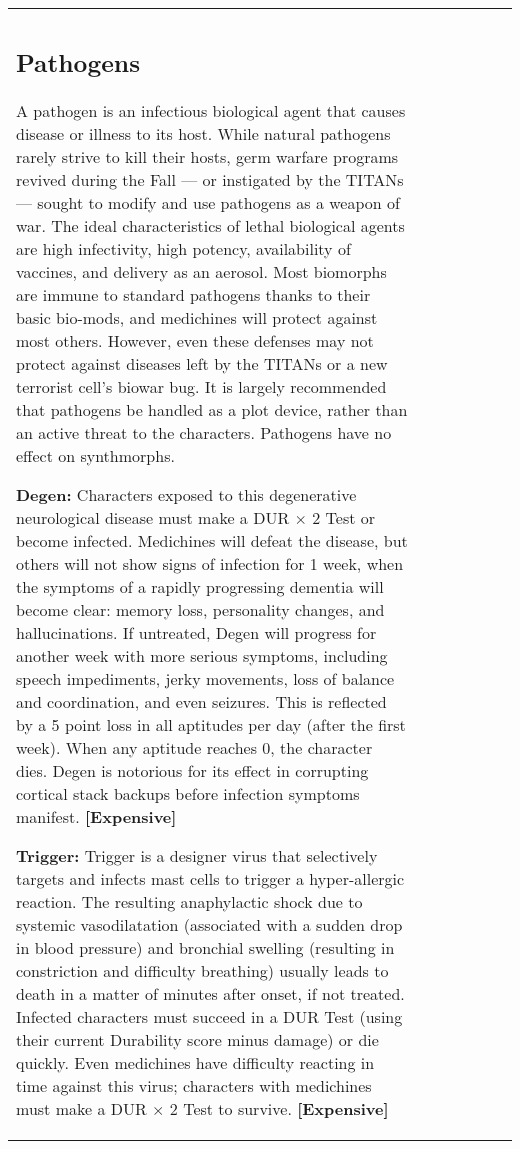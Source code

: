 \begin{tabular}{|l|l|l|l|l|l|l|}
\subsection{Pathogens} \label{sec:pathogens} 

A pathogen is an infectious biological agent that causes disease or illness to its host. While natural pathogens rarely strive to kill their hosts, germ warfare programs revived during the Fall --- or instigated by the TITANs --- sought to modify and use pathogens as a weapon of war. The ideal characteristics of lethal biological agents are high infectivity, high potency, availability of vaccines, and delivery as an aerosol. Most biomorphs are immune to standard pathogens thanks to their basic bio-mods, and medichines will protect against most others. However, even these defenses may not protect against diseases left by the TITANs or a new terrorist cell’s biowar bug. It is largely recommended that pathogens be handled as a plot device, rather than an active threat to the characters. Pathogens have no effect on synthmorphs. 

\textbf{Degen:} Characters exposed to this degenerative neurological disease must make a DUR $\times$ 2 Test or become infected. Medichines will defeat the disease, but others will not show signs of infection for 1 week, when the symptoms of a rapidly progressing dementia will become clear: memory loss, personality changes, and hallucinations. If untreated, Degen will progress for another week with more serious symptoms, including speech impediments, jerky movements, loss of balance and coordination, and even seizures. This is reflected by a 5 point loss in all aptitudes per day (after the first week). When any aptitude reaches 0, the character dies. Degen is notorious for its effect in corrupting cortical stack backups before infection symptoms manifest. \textbf{[Expensive]} 

\textbf{Trigger:} Trigger is a designer virus that selectively targets and infects mast cells to trigger a hyper-allergic reaction. The resulting anaphylactic shock due to systemic vasodilatation (associated with a sudden drop in blood pressure) and bronchial swelling (resulting in constriction and difficulty breathing) usually leads to death in a matter of minutes after onset, if not treated. Infected characters must succeed in a DUR Test (using their current Durability score minus damage) or die quickly. Even medichines have difficulty reacting in time against this virus; characters with medichines must make a DUR $\times$ 2 Test to survive. \textbf{[Expensive]} 




\end{tabular}
